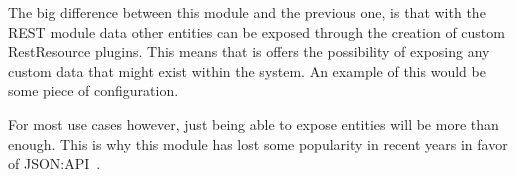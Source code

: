 The big difference between this module and the previous one, is that with the REST module data other entities can be exposed through the creation of custom RestResource plugins. This means that is offers the possibility of exposing any custom data that might exist within the system. An example of this would be some piece of configuration.

For most use cases however, just being able to expose entities will be more than enough. This is why this module has lost some popularity in recent years in favor of JSON:API~\autocite{So2018}.
